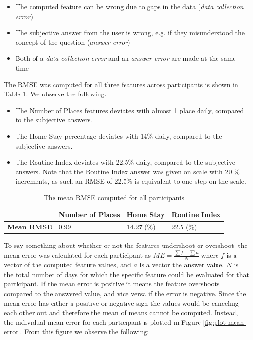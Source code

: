 \begin{itemize}
    \item The computed feature can be wrong due to gaps in the data (\textit{data collection error})
    \item The subjective answer from the user is wrong, e.g. if they misunderstood the concept of the question (\textit{answer error})
    \item Both of a \textit{data collection error} and an \textit{answer error} are made at the same time
\end{itemize}

The RMSE was computed for all three features across participants is shown in Table \ref{tab:error-table}. We observe the following:

\begin{itemize}
    \item The Number of Places features deviates with almost 1 place daily, compared to the subjective answers.

    \item The Home Stay percentage deviates with 14\% daily, compared to the subjective answers.

    \item The Routine Index deviates with 22.5\% daily, compared to the subjective answers. Note that the Routine Index answer was given on scale with 20 \% increments, as such an RMSE of 22.5\% is equivalent to one step on the scale.
\end{itemize}

\begin{table}[]
    \centering
    \begin{tabular}{|l|l|l|l|}
    \hline
                        & \textbf{Number of Places} & \textbf{Home Stay} & \textbf{Routine Index} \\ \hline
    \textbf{Mean RMSE}       & 0.99                      & 14.27 (\%)         & 22.5 (\%)              \\ \hline
    \end{tabular}
    \caption{The mean RMSE computed for all participants}
    \label{tab:error-table}
\end{table}


To say something about whether or not the features undershoot or overshoot, the mean error was calculated for each participant as $ME = \frac{\sum f - \sum a}{N}$ where $f$ is a vector of the computed feature values, and $a$ is a vector the answer value. $N$ is the total number of days for which the specific feature could be evaluated for that participant. If the mean error is positive it means the feature overshoots compared to the answered value, and vice versa if the error is negative. Since the mean error has either a positive or negative sign the values would be canceling each other out and therefore the mean of means cannot be computed. Instead, the individual mean error for each participant is plotted in Figure \ref{fig:plot-mean-error}. From this figure we observe the following:

